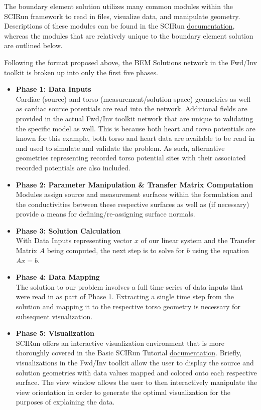 The boundary element solution utilizes many common modules within the SCIRun framework
to read in files, visualize data, and manipulate geometry. Descriptions of these modules
can be found in the SCIRun \href{http://sciinstitute.github.io/scirun.pages/modules.html}{{documentation}}, whereas the modules that are relatively unique to the boundary element solution are outlined below.

Following the format proposed above, the BEM Solutions network in the Fwd/Inv toolkit is broken up into only the first five phases.
\begin{itemize}
\item {\bf Phase 1: Data Inputs} \\
Cardiac (source) and torso (measurement/solution space) geometries as well as cardiac source potentials are read into the network.  Additional fields are provided in the actual Fwd/Inv toolkit network that are unique to validating the specific model as well.  This is because both heart and torso potentials are known for this example, both torso and heart data are available to be read in and used to simulate and validate the problem.  As such, alternative geometries representing recorded torso potential sites with their associated recorded potentials are also included.
\item {\bf Phase 2: Parameter Manipulation \& Transfer Matrix Computation} \\
Modules assign source and measurement surfaces within the formulation and the conductivities between these respective surfaces as well as (if necessary) provide a means for defining/re-assigning surface normals.
\item {\bf Phase 3: Solution Calculation} \\
With Data Inputs representing vector $x$ of our linear system and the Transfer Matrix $A$ being computed, the next step is to solve for $b$ using the equation $Ax = b$.
\item {\bf Phase 4: Data Mapping} \\
The solution to our problem involves a full time series of data inputs that were read in as part of Phase 1. Extracting a single time step from the solution and mapping it to the respective torso geometry is necessary for subsequent visualization.
\item {\bf Phase 5: Visualization} \\
SCIRun offers an interactive visualization environment that is more thoroughly covered in the Basic SCIRun Tutorial \href{http://sciinstitute.github.io/scirun.pages/BasicTutorial.html}{documentation}. Briefly, visualizations in the Fwd/Inv toolkit allow the user to display the source and solution geometries with data values mapped and colored onto each respective surface.  The view window allows the user to then interactively manipulate the view orientation in order to generate the optimal visualization for the purposes of explaining the data.
\end{itemize}

